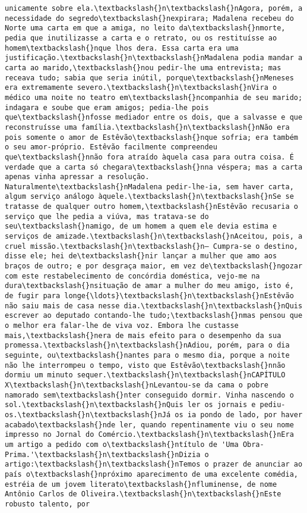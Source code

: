 \documentclass[11pt]{article}
\begin{document}
\begin{Verbatim}[commandchars=\\\{\}]
unicamente sobre ela.\textbackslash{}n\textbackslash{}nAgora, porém, a necessidade do segredo\textbackslash{}nexpirara; Madalena recebeu do Norte uma carta em que a amiga, no leito da\textbackslash{}nmorte, pedia que inutilizasse a carta e o retrato, ou os restituísse ao homem\textbackslash{}nque lhos dera. Essa carta era uma justificação.\textbackslash{}n\textbackslash{}nMadalena podia mandar a carta ao marido,\textbackslash{}nou pedir-lhe uma entrevista; mas receava tudo; sabia que seria inútil, porque\textbackslash{}nMeneses era extremamente severo.\textbackslash{}n\textbackslash{}nVira o médico uma noite no teatro em\textbackslash{}ncompanhia de seu marido; indagara e soube que eram amigos; pedia-lhe pois que\textbackslash{}nfosse mediador entre os dois, que a salvasse e que reconstruísse uma família.\textbackslash{}n\textbackslash{}nNão era pois somente o amor de Estêvão\textbackslash{}nque sofria; era também o seu amor-próprio. Estêvão facilmente compreendeu que\textbackslash{}nnão fora atraído àquela casa para outra coisa. É verdade que a carta só chegara\textbackslash{}nna véspera; mas a carta apenas vinha apressar a resolução. Naturalmente\textbackslash{}nMadalena pedir-lhe-ia, sem haver carta, algum serviço análogo àquele.\textbackslash{}n\textbackslash{}nSe se tratasse de qualquer outro homem,\textbackslash{}nEstêvão recusaria o serviço que lhe pedia a viúva, mas tratava-se do seu\textbackslash{}namigo, de um homem a quem ele devia estima e serviços de amizade.\textbackslash{}n\textbackslash{}nAceitou, pois, a cruel missão.\textbackslash{}n\textbackslash{}n— Cumpra-se o destino, disse ele; hei de\textbackslash{}nir lançar a mulher que amo aos braços de outro; e por desgraça maior, em vez de\textbackslash{}ngozar com este restabelecimento de concórdia doméstica, vejo-me na dura\textbackslash{}nsituação de amar a mulher do meu amigo, isto é, de fugir para longe{\ldots}\textbackslash{}n\textbackslash{}nEstêvão não saiu mais de casa nesse dia.\textbackslash{}n\textbackslash{}nQuis escrever ao deputado contando-lhe tudo;\textbackslash{}nmas pensou que o melhor era falar-lhe de viva voz. Embora lhe custasse mais,\textbackslash{}nera de mais efeito para o desempenho da sua promessa.\textbackslash{}n\textbackslash{}nAdiou, porém, para o dia seguinte, ou\textbackslash{}nantes para o mesmo dia, porque a noite não lhe interrompeu o tempo, visto que Estêvão\textbackslash{}nnão dormiu um minuto sequer.\textbackslash{}n\textbackslash{}nCAPÍTULO X\textbackslash{}n\textbackslash{}nLevantou-se da cama o pobre namorado sem\textbackslash{}nter conseguido dormir. Vinha nascendo o sol.\textbackslash{}n\textbackslash{}nQuis ler os jornais e pediu-os.\textbackslash{}n\textbackslash{}nJá os ia pondo de lado, por haver acabado\textbackslash{}nde ler, quando repentinamente viu o seu nome impresso no Jornal do Comércio.\textbackslash{}n\textbackslash{}nEra um artigo a pedido com o\textbackslash{}ntítulo de 'Uma Obra-Prima.'\textbackslash{}n\textbackslash{}nDizia o artigo:\textbackslash{}n\textbackslash{}nTemos o prazer de anunciar ao país o\textbackslash{}npróximo aparecimento de uma excelente comédia, estréia de um jovem literato\textbackslash{}nfluminense, de nome Antônio Carlos de Oliveira.\textbackslash{}n\textbackslash{}nEste robusto talento, por 
\end{Verbatim}
\end{document}
